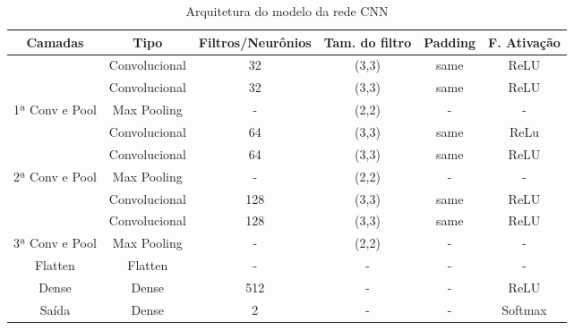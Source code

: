\documentclass[]{abntex2}
\begin{document}
\begin{table}[H]
    \centering
    \begin{tabular}{|c|c|c|c|c|c|}
    \hline
    \rowcolor[HTML]{C0C0C0} 
    Camadas                                                  & Tipo          & Filtros/Neurônios & Tam. do filtro & Padding & F. Ativação \\ \hline
    \cellcolor[HTML]{C0C0C0}                                 & Convolucional & 32                   & (3,3)             & same    & ReLU        \\ \cline{2-6} 
    \cellcolor[HTML]{C0C0C0}                                 & Convolucional & 32                   & (3,3)             & same    & ReLU        \\ \cline{2-6} 
    \multirow{-3}{*}{\cellcolor[HTML]{C0C0C0}1ª Conv e Pool} & Max Pooling   & -                    & (2,2)             & -       & -           \\ \hline
    \cellcolor[HTML]{C0C0C0}                                 & Convolucional & 64                   & (3,3)             & same    & ReLu        \\ \cline{2-6} 
    \cellcolor[HTML]{C0C0C0}                                 & Convolucional & 64                   & (3,3)             & same    & ReLU        \\ \cline{2-6} 
    \multirow{-3}{*}{\cellcolor[HTML]{C0C0C0}2ª Conv e Pool} & Max Pooling   & -                    & (2,2)             & -       & -           \\ \hline
    \cellcolor[HTML]{C0C0C0}                                 & Convolucional & 128                  & (3,3)             & same    & ReLU        \\ \cline{2-6} 
    \cellcolor[HTML]{C0C0C0}                                 & Convolucional & 128                  & (3,3)             & same    & ReLU        \\ \cline{2-6} 
    \multirow{-3}{*}{\cellcolor[HTML]{C0C0C0}3ª Conv e Pool} & Max Pooling   & -                    & (2,2)             & -       & -           \\ \hline
    \cellcolor[HTML]{C0C0C0}Flatten                          & Flatten       & -                    & -                 & -       & -           \\ \hline
    \cellcolor[HTML]{C0C0C0}Dense                            & Dense         & 512                  & -                 & -       & ReLU        \\ \hline
    \cellcolor[HTML]{C0C0C0}Saída                            & Dense         & 2                    & -                 & -       & Softmax     \\ \hline
    \end{tabular}
    \caption{Arquitetura do modelo da rede CNN}
    \label{tab:arquiCNN}

\end{table}
\end{document}
